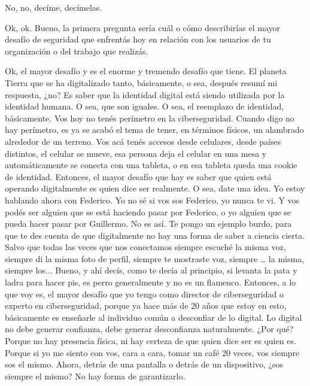 \begin{description}[leftmargin=0cm, labelsep=0.5cm]
    \item[\textbf{PITA GUILLERMO:}] No, no, decíme, decímelas.

    \item[\textbf{MUNTAABSKI FEDERICO:}] Ok, ok. Bueno, la primera pregunta sería cuál o cómo describirías el mayor desafío de seguridad que enfrentás hoy en relación con los usuarios de tu organización o del trabajo que realizás.

    \item[\textbf{PITA GUILLERMO:}] Ok, el mayor desafío y es el enorme y tremendo desafío que tiene. El planeta Tierra que se ha digitalizado tanto, básicamente, o sea, después resumí mi respuesta, ¿no? Es saber que la identidad digital está siendo utilizada por la identidad humana. O sea, que son iguales. O sea, el reemplazo de identidad, básicamente. Vos hoy no tenés perímetro en la ciberseguridad. Cuando digo no hay perímetro, es ya se acabó el tema de tener, en términos físicos, un alambrado alrededor de un terreno. Vos acá tenés accesos desde celulares, desde países distintos, el celular se mueve, esa persona deja el celular en una mesa y automáticamente se conecta con una tableta, o en esa tableta queda una cookie de identidad. Entonces, el mayor desafío que hay es saber que quien está operando digitalmente es quien dice ser realmente. O sea, date una idea. Yo estoy hablando ahora con Federico. Yo no sé si vos sos Federico, yo nunca te vi. Y vos podés ser alguien que se está haciendo pasar por Federico, o yo alguien que se pueda hacer pasar por Guillermo. No es así. Te pongo un ejemplo burdo, para que te des cuenta de que digitalmente no hay una forma de saber a ciencia cierta. Salvo que todas las veces que nos conectamos siempre escuché la misma voz, siempre di la misma foto de perfil, siempre te mostraste voz, siempre … la misma, siempre los... Bueno, y ahí decís, como te decía al principio, si levanta la pata y ladra para hacer pis, es perro generalmente y no es un flamenco. Entonces, a lo que voy es, el mayor desafío que yo tengo como director de ciberseguridad o experto en ciberseguridad, porque ya hace más de 20 años que estoy en esto, básicamente es enseñarle al individuo común a desconfiar de lo digital. Lo digital no debe generar confianza, debe generar desconfianza naturalmente. ¿Por qué? Porque no hay presencia física, ni hay certeza de que quien dice ser es quien es. Porque si yo me siento con vos, cara a cara, tomar un café 20 veces, vos siempre sos el mismo. Ahora, detrás de una pantalla o detrás de un dispositivo, ¿sos siempre el mismo? No hay forma de garantizarlo.


\end{description}
